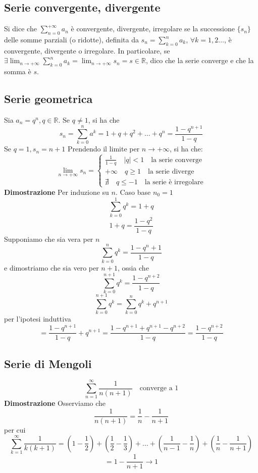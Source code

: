 \documentclass[12pt]{article}
\begin{document}
\subsection{Serie convergente, divergente}
Si dice che $\displaystyle \sum_{n=0}^{+\infty} a_n$ è convergente, divergente, irregolare se la successione $\{ s_n \}$ delle somme parziali (o ridotte), definita da $s_n = \sum_{k=0}^n a_k$, $\forall k = 1, 2 \dots$, è convergente, divergente o irregolare. In particolare, se $\displaystyle \exists \lim_{n \to +\infty} \sum_{k=0}^n a_k = \lim_{n \to +\infty} s_n = s \in \mathbb{R}$, dico che la serie converge e che la somma è $s$.

\subsection{Serie geometrica}
Sia \(a_n = q^n, q \in \mathbb{R}\). Se \(q \neq 1\), si ha che
\[ s_n =  \sum_{k=0}^n a^k = 1 + q + q^2 + \dots + q^n = \frac{1-q^{n+1}}{1-q}\]
Se \(q=1, s_n = n+1\)
Prendendo il limite per \(n \to +\infty\), si ha che:
\[
\lim_{n \to +\infty} s_n = 
\begin{cases}
\frac{1}{1-q} \quad |q| < 1 \quad \text{la serie converge}\\
+\infty \quad q \geq 1 \quad \text{la serie diverge}\\
\nexists \quad q \leq -1 \quad \text{la serie è irregolare}
\end{cases}
\]
\textbf{Dimostrazione}\newline
Per induzione su \(n\). Caso base \(n_0 = 1\)
\[\sum_{k=0}^1 q^k = 1+q\]
\[1+q = \frac{1-q^2}{1-q}\]
Supponiamo che sia vera per $n$
\[ \sum_{k=0}^n q^k = \frac{1-q^n+1}{1-q}\]
e dimostriamo che sia vero per $n+1$, ossia che
\[ \sum_{k=0}^{n+1} q^k = \frac{1-q^{n+2}}{1-q} \]
\[  \sum_{k=0}^{n+1} q^k =  \sum_{k=0}^{n} q^k + q^{n+1}\]
per l'ipotesi induttiva
\[ = \frac{1-q^{n+1}}{1-q}+q^{n+1} = \frac{1-q^{n+1}+q^{n+1}-q^{n+2}}{1-q} = \frac{1-q^{n+2}}{1-q}\]

\subsection{Serie di Mengoli}
\[ \sum_{n = 1}^{\infty} \frac{1}{n(n+1)} \quad \text{converge a 1}\]
\textbf{Dimostrazione}\newline
Osserviamo che
\[ \frac{1}{n(n+1)} = \frac{1}{n} - \frac{1}{n+1}\]
per cui
\[ \sum_{k = 1}^{\infty} \frac{1}{k(k+1)} = \left(1- \frac{1}{2} \right) + \left(\frac{1}{2} - \frac{1}{3} \right) + \dots + \left( \frac{1}{n-1} - \frac{1}{n} \right) + \left( \frac{1}{n} - \frac{1}{n+1} \right) \]
\[ = 1 - \frac{1}{n+1} \to 1\]
\end{document}
